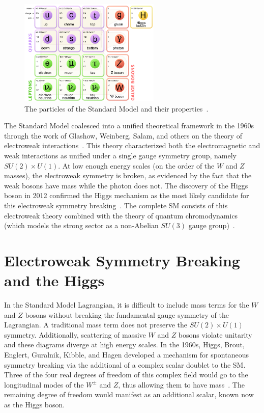 \begin{figure}[h!]
  \centering
  \captionsetup{justification=centering}

  \includegraphics[width=0.6\textwidth]{figures/SM_particles}
  \caption{The particles of the Standard Model and their properties~\cite{PDG}.}
  \label{fig:sm_particles}
\end{figure}

The Standard Model coalesced into a unified theoretical framework in the 1960s through the work of Glashow, Weinberg, Salam, and others on the theory of electroweak interactions~\cite{Glashow, Weinberg, Salam, Glashow2}. This theory characterized both the electromagnetic and weak interactions as unified under a single gauge symmetry group, namely $SU(2) \times U(1)$. At low enough energy scales (on the order of the $W$ and $Z$ masses), the electroweak symmetry is broken, as evidenced by the fact that the weak bosons have mass while the photon does not. The discovery of the Higgs boson in 2012 confirmed the Higgs mechanism as the most likely candidate for this electroweak symmetry breaking~\cite{Discovery, CMSDiscovery}. The complete SM consists of this electroweak theory combined with the theory of quantum chromodynamics (which models the strong sector as a non-Abelian $SU(3)$ gauge group)~\cite{QCDBook}. 

\section{Electroweak Symmetry Breaking and the Higgs}

In the Standard Model Lagrangian, it is difficult to include mass terms for the $W$ and $Z$ bosons without breaking the fundamental gauge symmetry of the Lagrangian. A traditional mass term does not preserve the $SU(2) \times U(1)$ symmetry. Additionally, scattering of massive $W$ and $Z$ bosons violate unitarity and these diagrams diverge at high energy scales. In the 1960s, Higgs, Brout, Englert, Guralnik, Kibble, and Hagen developed a mechanism for spontaneous symmetry breaking via the additional of a complex scalar doublet to the SM. Three of the four real degrees of freedom of this complex field would go to the longitudinal modes of the $W^{\pm}$ and $Z$, thus allowing them to have mass~\cite{Higgs1,Higgs2,Englert,Guralnik}. The remaining degree of freedom would manifest as an additional scalar, known now as the Higgs boson. 

